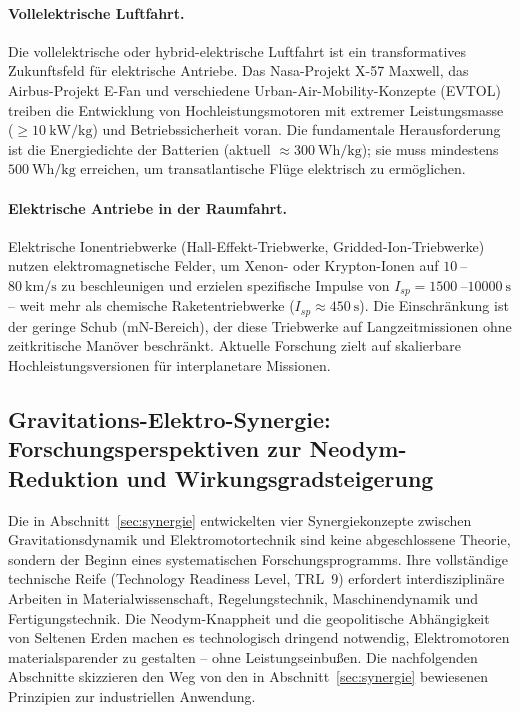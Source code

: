 ﻿\documentclass[12pt, a4paper]{report}
\theoremstyle{definition}
\theoremstyle{remark}
\begin{document}
\paragraph{Vollelektrische Luftfahrt.}
Die vollelektrische oder hybrid-elektrische Luftfahrt ist ein transformatives
Zukunftsfeld für elektrische Antriebe. Das Nasa-Projekt X-57 Maxwell, das
Airbus-Projekt E-Fan und verschiedene Urban-Air-Mobility-Konzepte (EVTOL)
treiben die Entwicklung von Hochleistungsmotoren mit extremer Leistungsmasse
($\geq \SI{10}{\kilo\watt\per\kilogram}$) und Betriebssicherheit voran.
Die fundamentale Herausforderung ist die Energiedichte der Batterien (aktuell
$\approx \SI{300}{\watt\hour\per\kilogram}$); sie muss mindestens $\SI{500}
{\watt\hour\per\kilogram}$ erreichen, um transatlantische Flüge elektrisch zu
ermöglichen.

\paragraph{Elektrische Antriebe in der Raumfahrt.}
Elektrische Ionentriebwerke (Hall-Effekt-Triebwerke, Gridded-Ion-Triebwerke)
nutzen elektromagnetische Felder, um Xenon- oder Krypton-Ionen auf
$\SI{10}{}$--$\SI{80}{\kilo\metre\per\second}$ zu beschleunigen und erzielen
spezifische Impulse von $I_{sp} = \SI{1500}{}$--$\SI{10000}{\second}$ -- weit
mehr als chemische Raketentriebwerke ($I_{sp} \approx \SI{450}{\second}$).
Die Einschränkung ist der geringe Schub ($\si{\milli\newton}$-Bereich), der
diese Triebwerke auf Langzeitmissionen ohne zeitkritische Manöver beschränkt.
Aktuelle Forschung zielt auf skalierbare Hochleistungsversionen für
interplanetare Missionen.

\subsection{Gravitations-Elektro-Synergie: Forschungsperspektiven zur
               Neodym-Reduktion und Wirkungsgradsteigerung}
\label{ssec:ausblick_synergie}

Die in Abschnitt~\ref{sec:synergie} entwickelten vier Synergiekonzepte zwischen
Gravitationsdynamik und Elektromotortechnik sind keine abgeschlossene Theorie,
sondern der Beginn eines systematischen Forschungsprogramms. Ihre vollständige
technische Reife (Technology Readiness Level, TRL~9) erfordert interdisziplinäre
Arbeiten in Materialwissenschaft, Regelungstechnik, Maschinendynamik und
Fertigungstechnik. Die Neodym-Knappheit und die geopolitische Abhängigkeit von
Seltenen Erden machen es technologisch dringend notwendig, Elektromotoren
materialsparender zu gestalten -- ohne Leistungseinbußen. Die nachfolgenden
Abschnitte skizzieren den Weg von den in Abschnitt~\ref{sec:synergie} bewiesenen
Prinzipien zur industriellen Anwendung.
\end{document}
